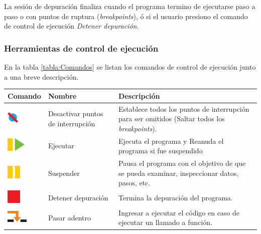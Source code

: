 La sesión de depuración finaliza cuando el programa termino de ejecutarse paso a paso o con puntos de ruptura (\emph{breakpoints}), ó si el usuario presiono el comando de control de ejecución \emph{Detener depuración}. 

\subsubsection{Herramientas de control de ejecución}
\label{subsubsec:Iniciar/Herramientas de control de ejecución}

En la tabla \ref{tabla:Comandos} se listan los comandos de control de ejecución junto a una breve descripción.

\begin{table}[!htbp]
	\centering
	\begin{tabular}{ >{\centering\arraybackslash}m{2cm} >{\arraybackslash}m{2cm} >{\arraybackslash}m{7cm}}
		\hline
		Comando &  Nombre & Descripción \\
		\hline \hline
		\includegraphics{./Figures/skip_breakpoints.PNG} & 
		Desactivar puntos de interrupción & Establece todos los puntos de interrupción para ser omitidos (Saltar todos los \emph{breakpoints}). \\
		\hline
		\includegraphics{./Figures/resume.PNG} & 
		Ejecutar & Ejecuta el programa y Reanuda el programa si fue suspendido \\
		\hline
		\includegraphics{./Figures/suspend.PNG} & Suspender & 
		Pausa el programa con el objetivo de que se pueda examinar, inspeccionar datos, pasos, etc. \\
		\hline
		\includegraphics{./Figures/terminate.PNG} & Detener depuración & 
		Termina la depuración del programa. \\
		\hline
		\includegraphics{./Figures/step_into.PNG} & Pasar adentro & Ingresar a ejecutar el código en caso de ejecutar un llamado a función. \\

\end{tabular}
\end{table}
